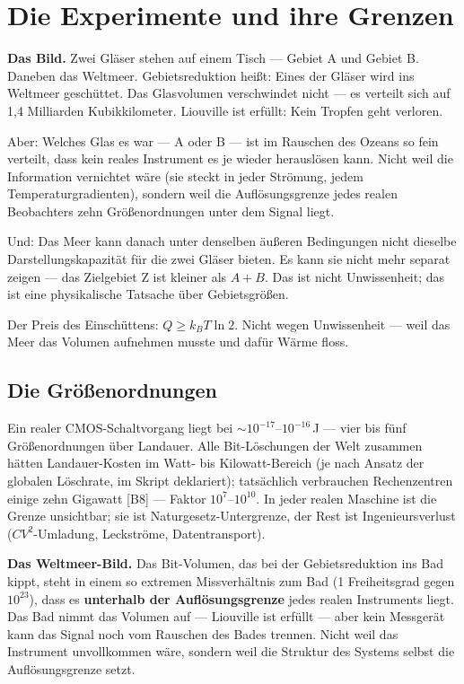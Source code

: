 \section{Die Experimente und ihre Grenzen}
\label{sec:experimente}

\textbf{Das Bild.} Zwei Gläser stehen auf einem Tisch --- Gebiet A und Gebiet B.
Daneben das Weltmeer. Gebietsreduktion heißt: Eines der Gläser wird ins Weltmeer
geschüttet. Das Glasvolumen verschwindet nicht --- es verteilt sich auf 1,4
Milliarden Kubikkilometer. Liouville ist erfüllt: Kein Tropfen geht verloren.

Aber: Welches Glas es war --- A oder B --- ist im Rauschen des Ozeans so fein
verteilt, dass kein reales Instrument es je wieder herauslösen kann. Nicht weil
die Information vernichtet wäre (sie steckt in jeder Strömung, jedem
Temperaturgradienten), sondern weil die Auflösungsgrenze jedes realen Beobachters
zehn Größenordnungen unter dem Signal liegt.

Und: Das Meer kann danach unter denselben äußeren Bedingungen nicht dieselbe
Darstellungskapazität für die zwei Gläser bieten. Es kann sie nicht mehr separat
zeigen --- das Zielgebiet Z ist kleiner als $A+B$. Das ist nicht Unwissenheit; das
ist eine physikalische Tatsache über Gebietsgrößen.

Der Preis des Einschüttens: $Q \ge k_B T \ln 2$. Nicht wegen Unwissenheit ---
weil das Meer das Volumen aufnehmen musste und dafür Wärme floss.

\subsection{Die Größenordnungen}

\LK {} Ein realer CMOS-Schaltvorgang liegt bei
${\sim}10^{-17}$--$10^{-16}$\,J --- vier bis fünf Größenordnungen über Landauer.
Alle Bit-Löschungen der Welt zusammen hätten Landauer-Kosten im Watt- bis
Kilowatt-Bereich (je nach Ansatz der globalen Löschrate, im Skript deklariert);
tatsächlich verbrauchen Rechenzentren einige zehn Gigawatt [B8] --- Faktor
$10^{7}$--$10^{10}$. In jeder realen Maschine ist die Grenze unsichtbar; sie ist
Naturgesetz-Untergrenze, der Rest ist Ingenieursverlust
($CV^2$-Umladung, Leckströme, Datentransport).

\LK \textbf{Das Weltmeer-Bild.} Das Bit-Volumen, das bei der Gebietsreduktion ins
Bad kippt, steht in einem so extremen Missverhältnis zum Bad (1 Freiheitsgrad
gegen $10^{23}$), dass es \textbf{unterhalb der Auflösungsgrenze} jedes realen
Instruments liegt. Das Bad nimmt das Volumen auf --- Liouville ist erfüllt ---
aber kein Messgerät kann das Signal noch vom Rauschen des Bades trennen. Nicht
weil das Instrument unvollkommen wäre, sondern weil die Struktur des Systems
selbst die Auflösungsgrenze setzt.

